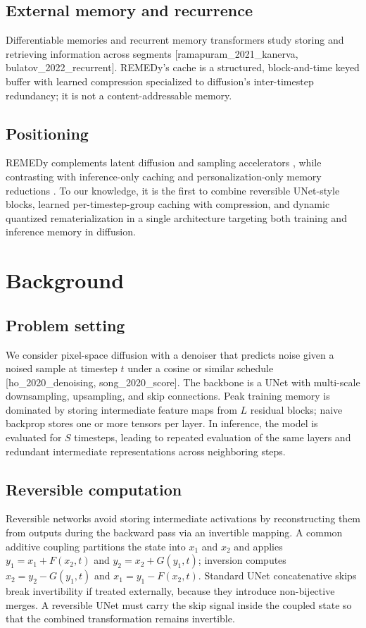 \documentclass{article}
\begin{document}
\subsection{External memory and recurrence}
Differentiable memories and recurrent memory transformers study storing and retrieving information across segments [ramapuram_2021_kanerva, bulatov_2022_recurrent]. REMEDy's cache is a structured, block-and-time keyed buffer with learned compression specialized to diffusion's inter-timestep redundancy; it is not a content-addressable memory.

\subsection{Positioning}
REMEDy complements latent diffusion \cite{rombach_2021_high} and sampling accelerators \cite{salimans_2024_multistep}, while contrasting with inference-only caching \cite{ma_2024_learning} and personalization-only memory reductions \cite{cho_2024_hollowed}. To our knowledge, it is the first to combine reversible UNet-style blocks, learned per-timestep-group caching with compression, and dynamic quantized rematerialization in a single architecture targeting both training and inference memory in diffusion.

\section{Background}
\subsection{Problem setting}
We consider pixel-space diffusion with a denoiser that predicts noise given a noised sample at timestep $t$ under a cosine or similar schedule [ho_2020_denoising, song_2020_score]. The backbone is a UNet with multi-scale downsampling, upsampling, and skip connections. Peak training memory is dominated by storing intermediate feature maps from $L$ residual blocks; naive backprop stores one or more tensors per layer. In inference, the model is evaluated for $S$ timesteps, leading to repeated evaluation of the same layers and redundant intermediate representations across neighboring steps.

\subsection{Reversible computation}
Reversible networks avoid storing intermediate activations by reconstructing them from outputs during the backward pass via an invertible mapping. A common additive coupling partitions the state into $x_1$ and $x_2$ and applies $y_1 = x_1 + F(x_2, t)$ and $y_2 = x_2 + G(y_1, t)$; inversion computes $x_2 = y_2 - G(y_1, t)$ and $x_1 = y_1 - F(x_2, t)$. Standard UNet concatenative skips break invertibility if treated externally, because they introduce non-bijective merges. A reversible UNet must carry the skip signal inside the coupled state so that the combined transformation remains invertible.
\end{document}
